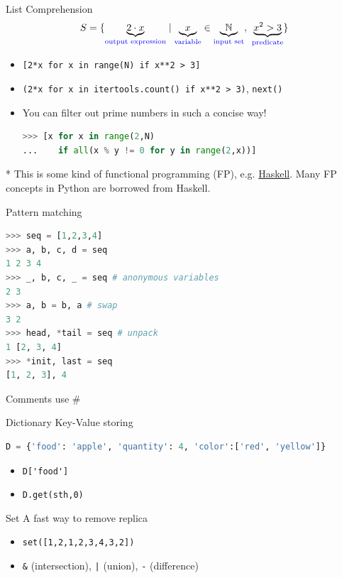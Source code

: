 \documentclass{../TexTemplate/myslide}
\begin{document}
\begin{frame}[fragile]{List Comprehension}
\[{\displaystyle S=\{\underbrace {2\cdot x} _{\color {blue}{\text{output expression}}}\mid \underbrace {x} _{\color {blue}{\text{variable}}}\in \underbrace {\mathbb {N} } _{\color {blue}{\text{input set}}},\ \underbrace {x^{2}>3} _{\color {blue}{\text{predicate}}}\}}\]
\pause
\begin{itemize}
\item \verb'[2*x for x in range(N) if x**2 > 3]'
\pause
\item \verb'(2*x for x in itertools.count() if x**2 > 3)', \verb'next()'
\pause
\item You can filter out prime numbers in such a concise way!
\begin{lstlisting}[language=python]
>>> [x for x in range(2,N)
...    if all(x % y != 0 for y in range(2,x))]
\end{lstlisting}
\end{itemize}
\pause
* This is some kind of functional programming (FP), e.g. \href{https://www.haskell.org/}{Haskell}. Many FP concepts in Python are borrowed from Haskell.
\end{frame}

\begin{frame}[fragile]{Pattern matching}
\begin{lstlisting}[language=python]
>>> seq = [1,2,3,4]
>>> a, b, c, d = seq
1 2 3 4
>>> _, b, c, _ = seq # anonymous variables
2 3
>>> a, b = b, a # swap
3 2
>>> head, *tail = seq # unpack
1 [2, 3, 4]
>>> *init, last = seq
[1, 2, 3], 4
\end{lstlisting}
\small * Comments use \#
\end{frame}

\begin{frame}[fragile]{Dictionary}
Key-Value storing
\begin{lstlisting}[language=python]
D = {'food': 'apple', 'quantity': 4, 'color':['red', 'yellow']}
\end{lstlisting}
\begin{itemize}
	\item \verb;D['food'];
	\item \verb'D.get(sth,0)'
\end{itemize}
\end{frame}

\begin{frame}[fragile]{Set}
A fast way to remove replica
\begin{itemize}
	\item \verb'set([1,2,1,2,3,4,3,2])'
	\item \verb'&' (intersection), \verb'|' (union), \verb'-' (difference)
\end{itemize}
\end{frame}
\end{document}
